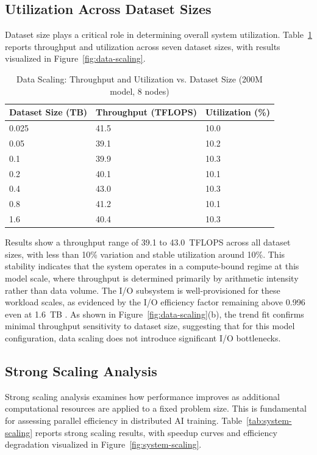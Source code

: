 \documentclass{llncs}
\begin{document}
\subsection{Utilization Across Dataset Sizes}

Dataset size plays a critical role in determining overall system utilization. Table~\ref{tab:data-scaling} reports throughput and utilization across seven dataset sizes, with results visualized in Figure~\ref{fig:data-scaling}.

\begin{table}[t]
\centering
\caption{Data Scaling: Throughput and Utilization vs. Dataset Size (200M model, 8 nodes)}
\label{tab:data-scaling}
\begin{tabular*}{\columnwidth}{@{\extracolsep{\fill}} lll @{}}
\toprule
\textbf{Dataset Size (TB)} & \textbf{Throughput (TFLOPS)} & \textbf{Utilization (\%)} \\
\midrule
0.025 & 41.5 & 10.0 \\
0.05 & 39.1 & 10.2 \\
0.1 & 39.9 & 10.3 \\
0.2 & 40.1 & 10.1 \\
0.4 & 43.0 & 10.3 \\
0.8 & 41.2 & 10.1 \\
1.6 & 40.4 & 10.3 \\
\bottomrule
\end{tabular*}
\end{table}

Results show a throughput range of 39.1 to 43.0~TFLOPS across all dataset sizes, with less than 10\% variation and stable utilization around 10\%. This stability indicates that the system operates in a compute-bound regime at this model scale, where throughput is determined primarily by arithmetic intensity rather than data volume. The I/O subsystem is well-provisioned for these workload scales, as evidenced by the I/O efficiency factor remaining above 0.996 even at 1.6~TB \cite{Byna2020}. As shown in Figure~\ref{fig:data-scaling}(b), the trend fit confirms minimal throughput sensitivity to dataset size, suggesting that for this model configuration, data scaling does not introduce significant I/O bottlenecks.

\subsection{Strong Scaling Analysis}

Strong scaling analysis examines how performance improves as additional computational resources are applied to a fixed problem size. This is fundamental for assessing parallel efficiency in distributed AI training. Table~\ref{tab:system-scaling} reports strong scaling results, with speedup curves and efficiency degradation visualized in Figure~\ref{fig:system-scaling}.
\end{document}
